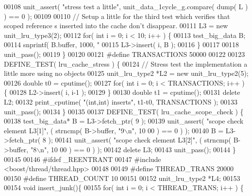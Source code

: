 \begin{DoxyCode}
00108         unit_assert( \textcolor{stringliteral}{"stress test a little"}, unit\_data\_1cycle\_g.compare( dump( L 
      ) ) == 0 );
00109 
00110         \textcolor{comment}{// Setup a little for the third test which verifies that scoped reference
      s inserted into the cache don't disappear.}
00111         L3 = \textcolor{keyword}{new} unit_lru_type3(2);
00112         \textcolor{keywordflow}{for}( \textcolor{keywordtype}{int} i = 0; i < 10; i++ ) \{
00113                 test\_big\_data B;
00114                 snprintf( B.buffer, 1000, \textcolor{stringliteral}{"%
00115                 L3->insert( i, B );
00116         \}
00117 
00118         unit_pass();
00119 \}
00120 
00121 \textcolor{preprocessor}{#define TRANSACTIONS 50000}
00122 \textcolor{preprocessor}{}
00123 DEFINE_TEST( lru\_cache\_stress ) \{
00124         \textcolor{comment}{// Stress test the implementation a little more using no objects}
00125         unit_lru_type2 *L2 = \textcolor{keyword}{new} unit_lru_type2(5);
00126         \textcolor{keywordtype}{double} t0 = cputime();
00127         \textcolor{keywordflow}{for}( \textcolor{keywordtype}{int} i = 0; i < TRANSACTIONS; i++ ) \{
00128                 L2->insert( i, i-1 );
00129         \}
00130         \textcolor{keywordtype}{double} t1 = cputime();
00131         \textcolor{keyword}{delete} L2;
00132         print_cputime( \textcolor{stringliteral}{"(int,int) inserts"}, t1-t0, TRANSACTIONS );
00133         unit_pass();
00134 \}
00135 
00137 DEFINE_TEST( lru\_cache\_scope\_check ) \{
00138         test\_big\_data* B = L3->fetch_ptr( 9 );
00139         unit_assert( \textcolor{stringliteral}{"scope check element L3[1]"}, ( strncmp( B->buffer, \textcolor{stringliteral}{"9\(\backslash\)n"}, 10
      00 ) == 0 ) );
00140         B = L3->fetch_ptr( 8 );
00141         unit_assert( \textcolor{stringliteral}{"scope check element L3[2]"}, ( strncmp( B->buffer, \textcolor{stringliteral}{"8\(\backslash\)n"}, 10
      00 ) == 0 ) );
00142         \textcolor{keyword}{delete} L3;
00143         unit_pass();
00144 \}
00145 
00146 \textcolor{preprocessor}{#ifdef \_REENTRANT}
00147 \textcolor{preprocessor}{}\textcolor{preprocessor}{#include <boost/thread/thread.hpp>}
00148 
00149 \textcolor{preprocessor}{#define THREAD\_TRANS 20000}
00150 \textcolor{preprocessor}{}\textcolor{preprocessor}{#define THREAD\_COUNT 10}
00151 \textcolor{preprocessor}{}
00152 unit_lru_type2 *L4;
00153 
00154 \textcolor{keywordtype}{void} insert\_junk()\{
00155         \textcolor{keywordflow}{for}( \textcolor{keywordtype}{int} i = 0; i < THREAD\_TRANS; i++ ) \{
}
\end{DoxyCode}
